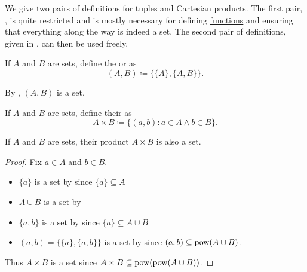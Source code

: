 \begin{remark}\label{remark:binary_vs_arbitrary_tuples}
  We give two pairs of definitions for tuples and Cartesian products. The first pair, , is quite restricted and is mostly necessary for defining \hyperref[def:function]{functions} and ensuring that everything along the way is indeed a set. The second pair of definitions, given in , can then be used freely.
\end{remark}

\begin{definition}\label{def:kuratowski_pair}
  If \( A \) and \( B \) are sets, define the  or  as
  \begin{equation*}
    (A, B) \coloneqq \{ \{ A \}, \{ A, B \} \}.
  \end{equation*}

  By , \( (A, B) \) is a set.
\end{definition}

\begin{definition}\label{def:binary_cartesian_product}
  If \( A \) and \( B \) are sets, define their  as
  \begin{equation*}
    A \times B \coloneqq \{ (a, b) \colon a \in A \land b \in B \}.
  \end{equation*}
\end{definition}

\begin{proposition}\label{thm:binary_cartesian_product_is_set}
  If \( A \) and \( B \) are sets, their product \( A \times B \) is also a set.
\end{proposition}
\begin{proof}
  Fix \( a \in A \) and \( b \in B \).
  \begin{itemize}
    \item \( \{ a \} \) is a set by  since \( \{ a \} \subseteq A \)
    \item \( A \cup B \) is a set by 
    \item \( \{ a, b \} \) is a set by  since \( \{ a \} \subseteq A \cup B \)
    \item \( (a, b) = \{ \{ a \}, \{ a, b \} \} \) is a set by  since \( (a, b) \subseteq \operatorname{pow}(A \cup B) \).
  \end{itemize}

  Thus \( A \times B \) is a set since \( A \times B \subseteq \operatorname{pow}(\operatorname{pow}(A \cup B)) \).
\end{proof}

